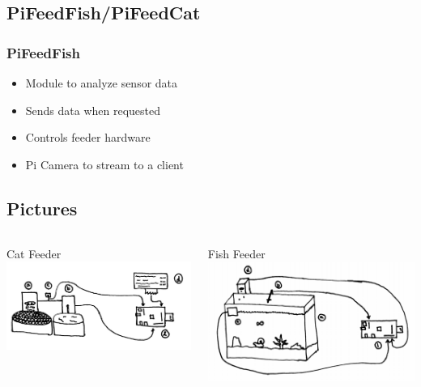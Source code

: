 \documentclass[]{beamer}
\begin{document}
\subsection{PiFeedFish/PiFeedCat}
\begin{frame}
	\frametitle{PiFeedFish}
    
    \begin{itemize}
    	\item Module to analyze sensor data
        \item Sends data when requested
        \item Controls feeder hardware
        \item Pi Camera to stream to a client
    \end{itemize}
\end{frame}

\subsection{Pictures}
\begin{frame}
	\begin{columns}[T]
    	\begin{column}{.5\textwidth}
        	\begin{block}{Cat Feeder}
				\includegraphics[width=\textwidth]{Cat}
            \end{block}
        \end{column}
        
    	\begin{column}{.5\textwidth}
        	\begin{block}{Fish Feeder}
            	\includegraphics[width=\textwidth]{FishTank}
            \end{block}
        \end{column}
    \end{columns}
\end{frame}
\end{document}
